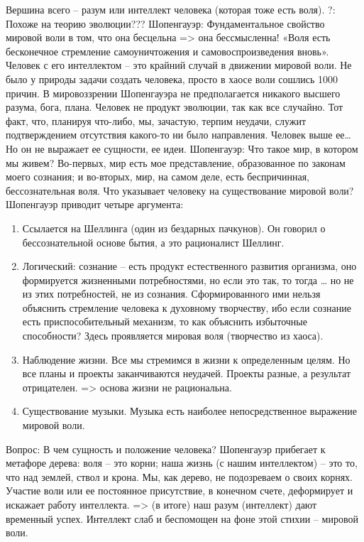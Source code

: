 \documentclass[12pt]{article}
\begin{document}
Вершина всего – разум или интеллект человека (которая тоже есть воля).
?: Похоже на теорию эволюции???
Шопенгауэр: Фундаментальное свойство мировой воли в том, что она бесцельна => она бессмысленна!
«Воля есть бесконечное стремление самоуничтожения и самовоспроизведения вновь».
Человек с его интеллектом – это крайний случай в движении мировой воли. Не было у природы задачи создать
человека, просто в хаосе воли сошлись 1000 причин.
В мировоззрении Шопенгауэра не предполагается никакого высшего разума, бога, плана. Человек не продукт
эволюции, так как все случайно. Тот факт, что, планируя что-либо, мы, зачастую, терпим неудачи, служит
подтверждением отсутствия какого-то ни было направления.
Человек выше ее… Но он не выражает ее сущности, ее идеи.
Шопенгауэр: Что такое мир, в котором мы живем? Во-первых, мир есть мое представление, образованное по
законам моего сознания; и во-вторых, мир, на самом деле, есть беспричинная, бессознательная воля.
Что указывает человеку на существование мировой воли? Шопенгауэр приводит четыре аргумента:
\begin{enumerate}
\item Ссылается на Шеллинга (один из бездарных пачкунов). Он говорил о бессознательной основе бытия, а это
рационалист Шеллинг. 
\item Логический: сознание  – есть продукт естественного развития  организма,  оно  формируется жизненными
потребностями, но если это так, то тогда … но не из этих потребностей, не из сознания. Сформированного ими
нельзя объяснить стремление человека к духовному творчеству, ибо если  сознание есть приспособительный
механизм, то как объяснить избыточные способности? Здесь проявляется мировая воля (творчество из хаоса). 
\item Наблюдение  жизни.  Все  мы  стремимся  в  жизни  к  определенным  целям.  Но  все  планы  и  проекты
заканчиваются неудачей. Проекты разные, а результат отрицателен. => основа жизни не рациональна. 
\item Существование музыки. Музыка есть наиболее непосредственное выражение мировой воли.
\end{enumerate}
Вопрос: В чем сущность и положение человека? 
Шопенгауэр прибегает к метафоре дерева: воля – это корни; наша жизнь (с нашим интеллектом) – это то, что
над землей, ствол и крона. Мы, как дерево, не подозреваем о своих корнях. Участие воли или ее постоянное
присутствие, в конечном счете, деформирует и искажает работу интеллекта. => (в итоге) наш разум (интеллект)
дают временный успех. Интеллект слаб и беспомощен на фоне этой стихии – мировой воли.
\end{document}
